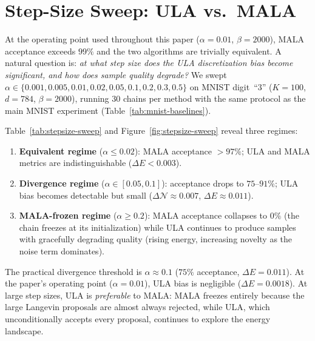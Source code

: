 \section{Step-Size Sweep: ULA vs.\ MALA}\label{app:stepsize-sweep}

At the operating point used throughout this paper ($\alpha{=}0.01$, $\beta{=}2000$), MALA acceptance exceeds $99\%$ and the two algorithms are trivially equivalent. A natural question is: \emph{at what step size does the ULA discretization bias become significant, and how does sample quality degrade?} We swept $\alpha\in\{0.001,0.005,0.01,0.02,0.05,0.1,0.2,0.3,0.5\}$ on MNIST digit~``3'' ($K{=}100$, $d{=}784$, $\beta{=}2000$), running 30 chains per method with the same protocol as the main MNIST experiment (Table~\ref{tab:mnist-baselines}).

Table~\ref{tab:stepsize-sweep} and Figure~\ref{fig:stepsize-sweep} reveal three regimes:
\begin{enumerate}
  \item \textbf{Equivalent regime} ($\alpha\leq 0.02$): MALA acceptance $>97\%$; ULA and MALA metrics are indistinguishable ($\Delta E < 0.003$).
  \item \textbf{Divergence regime} ($\alpha\in[0.05,0.1]$): acceptance drops to $75$--$91\%$; ULA bias becomes detectable but small ($\Delta\mathcal{N}\approx 0.007$, $\Delta E \approx 0.011$).
  \item \textbf{MALA-frozen regime} ($\alpha\geq 0.2$): MALA acceptance collapses to $0\%$ (the chain freezes at its initialization) while ULA continues to produce samples with gracefully degrading quality (rising energy, increasing novelty as the noise term dominates).
\end{enumerate}
The practical divergence threshold is $\alpha\approx 0.1$ ($75\%$ acceptance, $\Delta E = 0.011$). At the paper's operating point ($\alpha{=}0.01$), ULA bias is negligible ($\Delta E = 0.0018$). At large step sizes, ULA is \emph{preferable} to MALA: MALA freezes entirely because the large Langevin proposals are almost always rejected, while ULA, which unconditionally accepts every proposal, continues to explore the energy landscape.


